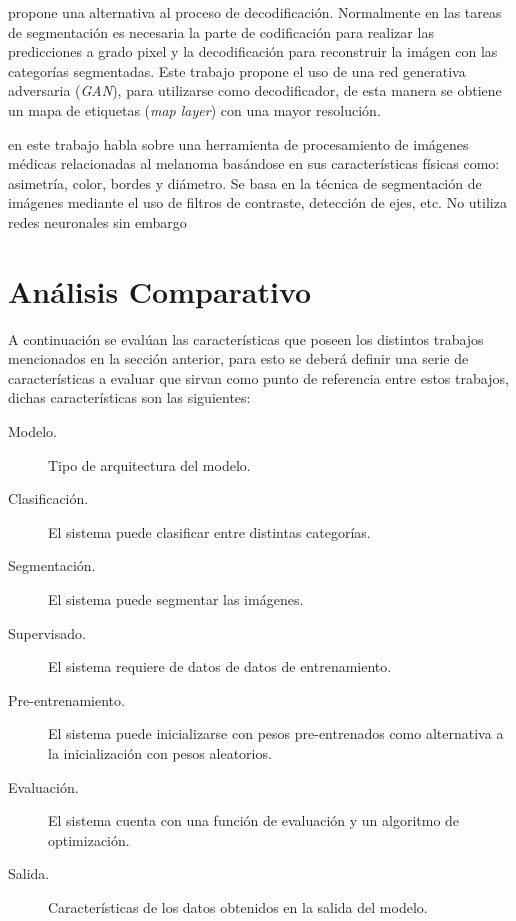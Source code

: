 \citet{DBLP:journals/corr/LucCCV16} propone una alternativa al proceso de decodificación. Normalmente en las tareas de segmentación es necesaria la parte de codificación para realizar las predicciones a grado pixel y la decodificación para reconstruir la imágen con las categorías segmentadas. Este trabajo propone el uso de una red generativa adversaria (\emph{GAN}), para utilizarse como decodificador, de esta manera se obtiene un mapa de etiquetas (\emph{map layer}) con una mayor resolución.

\citet{JAIN2015735} en este trabajo habla sobre una herramienta de procesamiento de imágenes médicas relacionadas al melanoma basándose en sus características físicas como: asimetría, color, bordes y diámetro. Se basa en la técnica de segmentación de imágenes mediante el uso de filtros de contraste, detección de ejes, etc. No utiliza redes neuronales sin embargo 


\section{Análisis Comparativo}
A continuación se evalúan las características que poseen los distintos trabajos mencionados en la sección anterior, para esto se deberá definir una serie de características a evaluar que sirvan como punto de referencia entre estos trabajos, dichas características son las siguientes:

\begin{description}
    \item[Modelo.]{Tipo de arquitectura del modelo.}
    \item[Clasificación.]{El sistema puede clasificar entre distintas categorías.}
    \item[Segmentación.]{El sistema puede segmentar las imágenes.}
    \item[Supervisado.]{ El sistema requiere de datos de datos de entrenamiento.}
    \item[Pre-entrenamiento.]{El sistema puede inicializarse con pesos pre-entrenados como alternativa a la inicialización con pesos aleatorios.}
    \item[Evaluación.]{El sistema cuenta con una función de evaluación y un algoritmo de optimización.}
    \item[Salida.]{Características de los datos obtenidos en la salida del modelo.}
\end{description}

